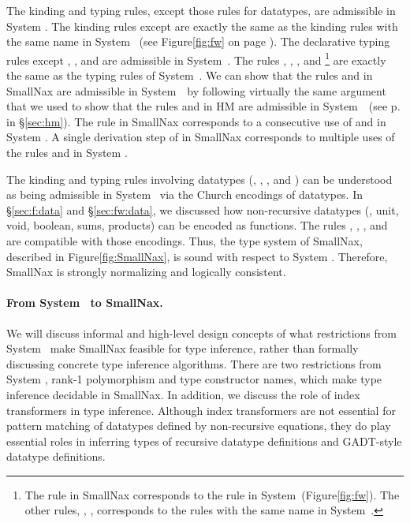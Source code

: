 The kinding and typing rules, except those rules for datatypes, are admissible
in System \Fw. The kinding rules except  are exactly the same as
the kinding rules with the same name in System \Fw\ (see Figure\;\ref{fig:fw}
on page \pageref{fig:fw}). The declarative typing rules except ,
, and  are admissible in System~\Fw. The rules
, , , and \footnote{
	The  rule in SmallNax corresponds to
	the  rule in System~\Fw (Figure\;\ref{fig:fw}).
	The other rules, , , 
	corresponds to the rules with the same name in System~\Fw.}
are exactly the same as the typing rules of System~\Fw.
We can show that the rules  and  in SmallNax are
admissible in System~\Fw\ by following virtually the same argument that 
we used to show that the rules  and  in HM are
admissible in System~\F\ (see p.\pageref{hm:LetAdmissibleFw} in \S\ref{sec:hm}).
The  rule in SmallNax corresponds to a consecutive use of
 and  in System \Fw. A single derivation step of
 in SmallNax corresponds to multiple uses of the rules
 and  in System \Fw.

The kinding and typing rules involving datatypes (,
, , and ) can be understood as
being admissible in System \Fw\ via the Church encodings of datatypes.
In \S\ref{sec:f:data} and \S\ref{sec:fw:data}, we discussed
how non-recursive datatypes (\eg, unit, void, boolean, sums, products)
can be encoded as functions. The rules , ,
, and  are compatible with those encodings.
Thus, the type system of SmallNax, described in Figure\;\ref{fig:SmallNax},
is sound with respect to System \Fw.
Therefore, SmallNax is strongly normalizing and logically consistent.

\paragraph{From System \Fw\ to SmallNax.}
We will discuss informal and high-level design concepts of what restrictions
from System \Fw\ make SmallNax feasible for type inference, rather than
formally discussing concrete type inference algorithms. There are two
restrictions from System \Fw, rank-1 polymorphism and type constructor names,
which make type inference decidable in SmallNax. In addition, we discuss
the role of index transformers in type inference. Although index transformers
are not essential for pattern matching of datatypes defined by non-recursive
equations, they do play essential roles in inferring types of recursive
datatype definitions and GADT-style datatype definitions.

